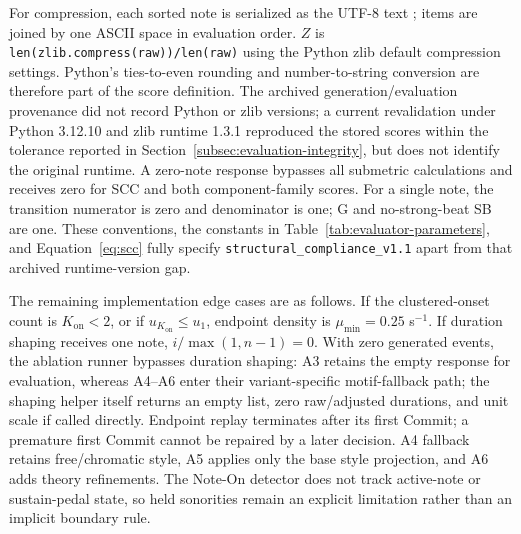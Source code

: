 \documentclass[11pt,a4paper]{article}
\begin{document}
For compression, each sorted note is serialized as the UTF-8 text ; items are joined by one ASCII space in evaluation order. $Z$ is \texttt{len(zlib.compress(raw))/len(raw)} using the Python zlib default compression settings. Python's ties-to-even rounding and number-to-string conversion are therefore part of the score definition. The archived generation/evaluation provenance did not record Python or zlib versions; a current revalidation under Python 3.12.10 and zlib runtime 1.3.1 reproduced the stored scores within the tolerance reported in Section~\ref{subsec:evaluation-integrity}, but does not identify the original runtime. A zero-note response bypasses all submetric calculations and receives zero for SCC and both component-family scores. For a single note, the transition numerator is zero and denominator is one; G and no-strong-beat SB are one. These conventions, the constants in Table~\ref{tab:evaluator-parameters}, and Equation~\eqref{eq:scc} fully specify \texttt{structural\_compliance\_v1.1} apart from that archived runtime-version gap.

The remaining implementation edge cases are as follows. If the clustered-onset count is $K_{\mathrm{on}}<2$, or if $u_{K_{\mathrm{on}}}\leq u_1$, endpoint density is $\mu_{\min}=0.25$ s$^{-1}$. If duration shaping receives one note, $i/\max(1,n-1)=0$. With zero generated events, the ablation runner bypasses duration shaping: A3 retains the empty response for evaluation, whereas A4--A6 enter their variant-specific motif-fallback path; the shaping helper itself returns an empty list, zero raw/adjusted durations, and unit scale if called directly. Endpoint replay terminates after its first Commit; a premature first Commit cannot be repaired by a later decision. A4 fallback retains free/chromatic style, A5 applies only the base style projection, and A6 adds theory refinements. The Note-On detector does not track active-note or sustain-pedal state, so held sonorities remain an explicit limitation rather than an implicit boundary rule.




\end{document}
